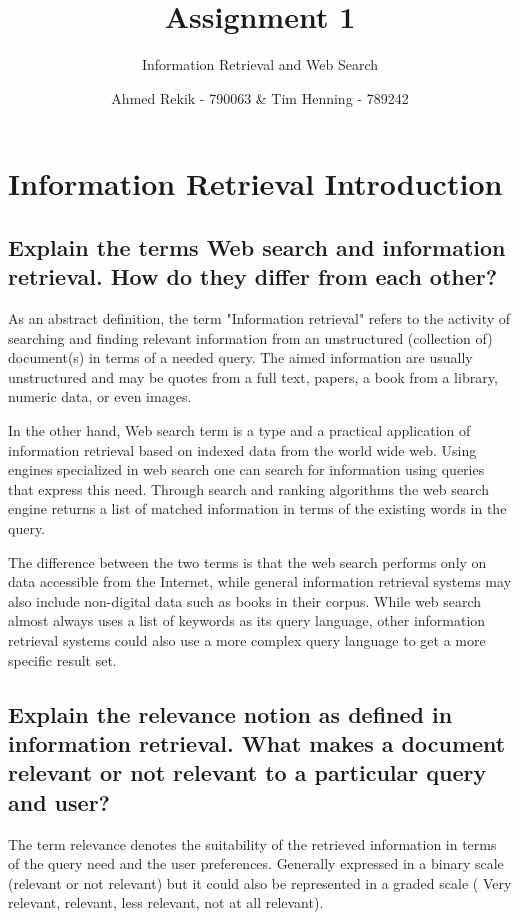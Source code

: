 \documentclass{scrartcl}
\title{Assignment 1}
\subtitle{Information Retrieval and Web Search}
\author{Ahmed Rekik - 790063 \& Tim Henning - 789242}
\begin{document}
\maketitle

\setcounter{section}{1}
\section{Information Retrieval Introduction}

\subsection{Explain the terms Web search and information retrieval. How do they differ from each
	other?}

As an abstract definition, the term  "Information retrieval" refers to the activity of searching and finding relevant information from an unstructured (collection of) document(s) in terms of a needed query. The aimed information are usually unstructured and may be quotes from a full text, papers, a book from a library, numeric data, or even images.

In the other hand, Web search term is a type and a practical application of information retrieval based on indexed data from the world wide web. Using engines specialized in web search one can search for information using queries that express this need. Through search and ranking algorithms the web search engine returns a list of matched information in terms of the existing words in the query.

The difference between the two terms is that the web search performs only on data accessible from the Internet, while general information retrieval systems may also include non-digital data such as books in their corpus. While web search almost always uses a list of keywords as its query language, other information retrieval systems could also use a more complex query language to get a more specific result set.

\subsection{Explain the relevance notion as defined in information retrieval. What makes a document
	relevant or not relevant to a particular query and user?}

The term relevance denotes the suitability of the retrieved information in terms of the query need and the user preferences. Generally expressed in a binary scale (relevant or not relevant) but it could also be represented in a graded scale ( Very relevant, relevant, less relevant, not at all relevant).
\end{document}
